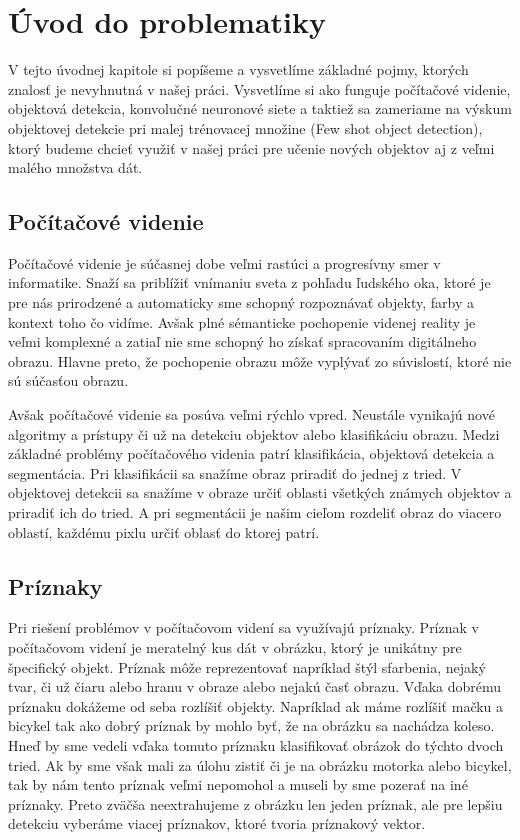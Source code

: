 \chapter{Úvod do problematiky}\label{chap:issues_overview}

V tejto úvodnej kapitole si popíšeme a vysvetlíme základné pojmy, ktorých znalosť je nevyhnutná v našej práci. Vysvetlíme si ako funguje počítačové videnie, objektová detekcia, konvolučné neuronové siete a taktiež sa zameriame na výskum objektovej detekcie pri malej trénovacej množine (Few shot object detection), ktorý budeme chcieť využiť v našej práci pre učenie nových objektov aj z veľmi malého množstva dát.

\section{Počítačové videnie}


\setlength{\parindent}{20pt}

\hspace{\parindent}Počítačové videnie je súčasnej dobe veľmi rastúci a progresívny smer v informatike. Snaží sa priblížiť vnímaniu sveta z pohľadu ľudského oka, ktoré je pre nás prirodzené a automaticky sme schopný rozpoznávať objekty, farby a kontext toho čo vidíme. Avšak plné sémanticke pochopenie videnej reality je veľmi komplexné a zatiaľ nie sme schopný ho získať spracovaním digitálneho obrazu. Hlavne preto, že pochopenie obrazu môže vyplývať zo súvislostí, ktoré nie sú súčasťou obrazu.

Avšak počítačové videnie sa posúva veľmi rýchlo vpred. Neustále vynikajú nové algoritmy a prístupy či už na detekciu objektov alebo klasifikáciu obrazu. Medzi základné problémy počítačového videnia patrí klasifikácia, objektová detekcia a segmentácia. Pri klasifikácii sa snažíme obraz priradiť do jednej z tried. V objektovej detekcii sa snažíme v obraze určiť oblasti všetkých známych objektov a priradiť ich do tried. A pri segmentácii je našim cieľom rozdeliť obraz do viacero oblastí, každému pixlu určiť oblasť do ktorej patrí. 

\section{Príznaky}

\hspace{\parindent}Pri riešení problémov v počítačovom videní sa využívajú príznaky. Príznak v počítačovom videní je meratelný kus dát v obrázku, ktorý je unikátny pre špecifický objekt. Príznak môže reprezentovať napríklad štýl sfarbenia, nejaký tvar, či už čiaru alebo hranu v obraze alebo nejakú časť obrazu. Vďaka dobrému príznaku dokážeme od seba rozlíšiť objekty. Napríklad ak máme rozlíšiť mačku a bicykel tak ako dobrý príznak by mohlo byť, že na obrázku sa nachádza koleso. Hneď by sme vedeli vďaka tomuto príznaku klasifikovať obrázok do týchto dvoch tried. Ak by sme však mali za úlohu zistiť či je na obrázku motorka alebo bicykel, tak by nám tento príznak veľmi nepomohol a museli by sme pozerať na iné príznaky. Preto zväčša neextrahujeme z obrázku len jeden príznak, ale pre lepšiu detekciu vyberáme viacej príznakov, ktoré tvoria príznakový vektor. 

